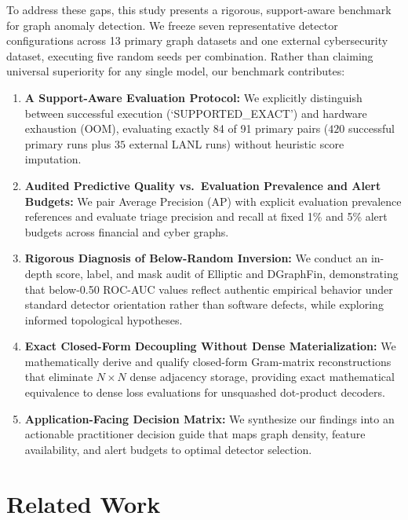 \documentclass[11pt,a4paper]{article}
\begin{document}
To address these gaps, this study presents a rigorous, support-aware benchmark for graph anomaly detection. We freeze seven representative detector configurations across 13 primary graph datasets and one external cybersecurity dataset, executing five random seeds per combination. Rather than claiming universal superiority for any single model, our benchmark contributes:
\begin{enumerate}
    \item \textbf{A Support-Aware Evaluation Protocol:} We explicitly distinguish between successful execution (`SUPPORTED\_EXACT') and hardware exhaustion (OOM), evaluating exactly 84 of 91 primary pairs ($420$ successful primary runs plus $35$ external LANL runs) without heuristic score imputation.
    \item \textbf{Audited Predictive Quality vs.\ Evaluation Prevalence and Alert Budgets:} We pair Average Precision (AP) with explicit evaluation prevalence references and evaluate triage precision and recall at fixed 1\% and 5\% alert budgets across financial and cyber graphs.
    \item \textbf{Rigorous Diagnosis of Below-Random Inversion:} We conduct an in-depth score, label, and mask audit of Elliptic and DGraphFin, demonstrating that below-0.50 ROC-AUC values reflect authentic empirical behavior under standard detector orientation rather than software defects, while exploring informed topological hypotheses.
    \item \textbf{Exact Closed-Form Decoupling Without Dense Materialization:} We mathematically derive and qualify closed-form Gram-matrix reconstructions that eliminate $N \times N$ dense adjacency storage, providing exact mathematical equivalence to dense loss evaluations for unsquashed dot-product decoders.
    \item \textbf{Application-Facing Decision Matrix:} We synthesize our findings into an actionable practitioner decision guide that maps graph density, feature availability, and alert budgets to optimal detector selection.
\end{enumerate}

\section{Related Work}
\label{sec:related}
\end{document}
